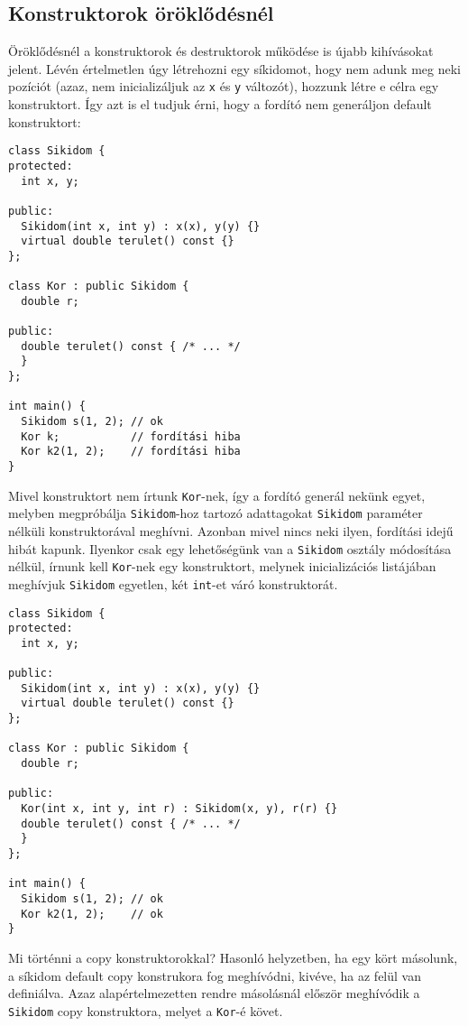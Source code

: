 \documentclass[../cpp_book/cpp_book.tex]{subfiles}
\begin{document}
	\subsection{Konstruktorok öröklődésnél}
	Öröklődésnél a konstruktorok és destruktorok működése is újabb kihívásokat jelent. Lévén értelmetlen úgy létrehozni egy síkidomot, hogy nem adunk meg neki pozíciót (azaz, nem inicializáljuk az \texttt{x} és \texttt{y} változót), hozzunk létre e célra egy konstruktort. Így azt is el tudjuk érni, hogy a fordító nem generáljon default konstruktort:
	\begin{lstlisting}
class Sikidom {
protected:
  int x, y;

public:
  Sikidom(int x, int y) : x(x), y(y) {}
  virtual double terulet() const {}
};

class Kor : public Sikidom {
  double r;

public:
  double terulet() const { /* ... */
  }
};

int main() {
  Sikidom s(1, 2); // ok
  Kor k;           // fordítási hiba
  Kor k2(1, 2);    // fordítási hiba
}
	\end{lstlisting}
	Mivel konstruktort nem írtunk \texttt{Kor}-nek, így a fordító generál nekünk egyet, melyben megpróbálja \texttt{Sikidom}-hoz tartozó adattagokat \texttt{Sikidom} paraméter nélküli konstruktorával meghívni. Azonban mivel nincs neki ilyen, fordítási idejű hibát kapunk. Ilyenkor csak egy lehetőségünk van a \texttt{Sikidom} osztály módosítása nélkül, írnunk kell \texttt{Kor}-nek egy konstruktort, melynek inicializációs listájában meghívjuk \texttt{Sikidom} egyetlen, két \texttt{int}-et váró konstruktorát.
\begin{lstlisting}
class Sikidom {
protected:
  int x, y;

public:
  Sikidom(int x, int y) : x(x), y(y) {}
  virtual double terulet() const {}
};

class Kor : public Sikidom {
  double r;

public:
  Kor(int x, int y, int r) : Sikidom(x, y), r(r) {}
  double terulet() const { /* ... */
  }
};

int main() {
  Sikidom s(1, 2); // ok
  Kor k2(1, 2);    // ok
}
\end{lstlisting}
	Mi történni a copy konstruktorokkal? Hasonló helyzetben, ha egy kört másolunk, a síkidom default copy konstrukora fog meghívódni, kivéve, ha az felül van definiálva. Azaz alapértelmezetten rendre másolásnál először meghívódik a \texttt{Sikidom} copy konstruktora, melyet a \texttt{Kor}-é követ.
	
\end{document}
